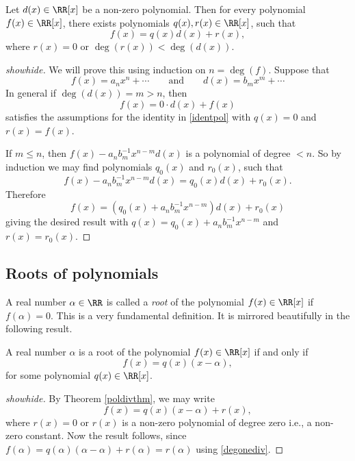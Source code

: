 \documentclass{article}
\begin{document}
\begin{theorem}[emph]\label{poldivthm}
Let $d(x)\in \RR[x]$ be a non-zero polynomial. Then 
for every polynomial $f(x)\in \RR[x]$, there exists
polynomials $q(x), r(x)\in \RR[x]$, such that
\begin{equation}\label{identpol}
f(x) = q(x) d(x) + r(x),
\end{equation}
where $r(x) = 0$ or $\deg(r(x)) < \deg(d(x))$.
\end{theorem}
\begin{proof}[showhide]
We will prove this using induction on $n = \deg(f)$. Suppose that
$$
f(x) = a_n x^n + \cdots\qquad\text{and}\qquad d(x) = b_m x^m + \cdots
$$
In general if $\deg(d(x)) = m > n$, then
$$
f(x) = 0\cdot d(x) + f(x)
$$
satisfies the assumptions for the identity in \eqref{identpol} with
$ q(x) = 0$ and $r(x) = f(x)$.

If $m\leq n$, then $f(x) - a_n b_m^{-1} x^{n-m} d(x)$ is a polynomial of
degree $<n$. So by induction we may find polynomials $q_0(x)$ and $r_0(x)$, such that
$$
f(x) - a_n b_m^{-1} x^{n-m} d(x) = q_0(x) d(x) + r_0(x).
$$
Therefore
$$
f(x) = (q_0(x) + a_n b_m^{-1} x^{n-m})d(x) + r_0(x)
$$
giving the desired result with $q(x) = q_0(x) + a_n b_m^{-1} x^{n-m}$ and $r(x) = r_0(x)$. 
\end{proof}




\subsection{Roots of polynomials}

A real number $\alpha\in \RR$ is called a \emph{root} of the polynomial $f(x)\in \RR[x]$ if
$f(\alpha) = 0$. This is a very fundamental definition. It is mirrored beautifully in the following
result.

\begin{proposition}\label{proproot}
A real number $\alpha$ is a root of the polynomial $f(x)\in \RR[x]$ if and only if
$$
f(x) = q(x) (x-\alpha),
$$
for some polynomial $q(x)\in \RR[x]$.
\end{proposition}
\begin{proof}[showhide]
By Theorem \ref{poldivthm}, we may write
\begin{equation}\label{degonediv}
f(x) = q(x)(x-\alpha) + r(x),
\end{equation}
where $r(x)= 0$ or $r(x)$ is a non-zero polynomial of degree zero i.e., a  non-zero
constant. Now the result follows, since $f(\alpha) = q(\alpha)(\alpha - \alpha) + r(\alpha) = r(\alpha)$ 
using \eqref{degonediv}.
\end{proof}
\end{document}
